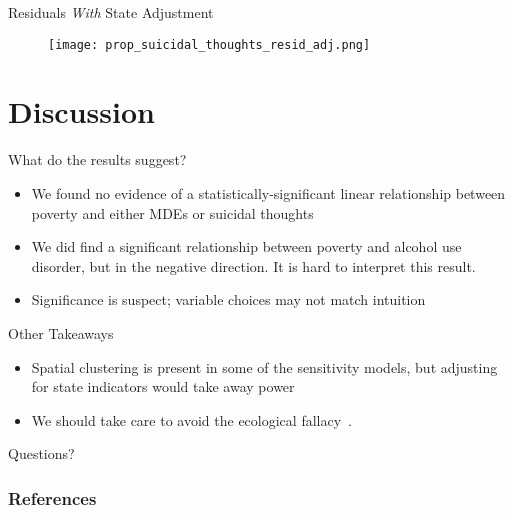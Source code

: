 \documentclass{beamer}
\begin{document}
\begin{frame}{Residuals \textit{With} State Adjustment}
\begin{figure}[!htb]
    \centering
    \texttt{[image: prop\_suicidal\_thoughts\_resid\_adj.png]}
\end{figure}
\end{frame}

\section{Discussion}

\begin{frame}{What do the results suggest?}
    \begin{itemize}
        \item We found no evidence of a statistically-significant linear
            relationship between poverty and either MDEs or suicidal thoughts\\
        \item We did find a significant relationship between poverty
            and alcohol use disorder, but in the negative direction.
            It is hard to interpret this result. \\
        \item Significance is suspect;
            variable choices may not match intuition\\
    \end{itemize}
\end{frame}

\begin{frame}{Other Takeaways}
    \begin{itemize}
        \item Spatial clustering is present in some of the sensitivity models,
            but adjusting for state indicators would take away power\\
        \item We should take care to avoid the ecological
            fallacy~\cite{piantadosi_1988}.\\
    \end{itemize}
\end{frame}

\begin{frame}{Questions?}
\end{frame}

\begin{frame}[allowframebreaks]
    \frametitle{References}
    \tiny
    \printbibliography
\end{frame}
\end{document}
